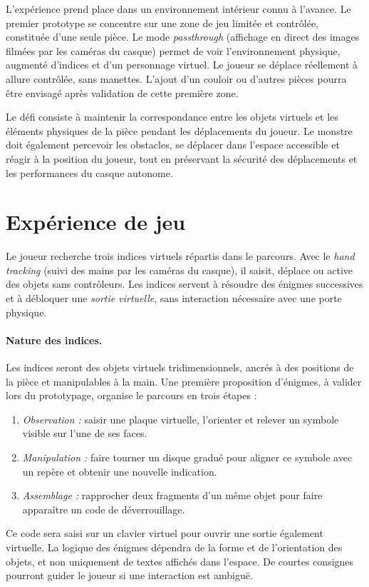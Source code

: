 \documentclass[11pt,a4paper]{article}
\begin{document}
L'expérience prend place dans un environnement intérieur connu à l'avance. Le premier prototype se concentre sur une zone de jeu limitée et contrôlée, constituée d'une seule pièce. Le mode \emph{passthrough} (affichage en direct des images filmées par les caméras du casque) permet de voir l'environnement physique, augmenté d'indices et d'un personnage virtuel. Le joueur se déplace réellement à allure contrôlée, sans manettes. L'ajout d'un couloir ou d'autres pièces pourra être envisagé après validation de cette première zone.

Le défi consiste à maintenir la correspondance entre les objets virtuels et les éléments physiques de la pièce pendant les déplacements du joueur. Le monstre doit également percevoir les obstacles, se déplacer dans l'espace accessible et réagir à la position du joueur, tout en préservant la sécurité des déplacements et les performances du casque autonome.

\section{Expérience de jeu}

Le joueur recherche trois indices virtuels répartis dans le parcours. Avec le \emph{hand tracking} (suivi des mains par les caméras du casque), il saisit, déplace ou active des objets sans contrôleurs. Les indices servent à résoudre des énigmes successives et à débloquer une \emph{sortie virtuelle}, sans interaction nécessaire avec une porte physique.

\paragraph{Nature des indices.} Les indices seront des objets virtuels tridimensionnels, ancrés à des positions de la pièce et manipulables à la main. Une première proposition d'énigmes, à valider lors du prototypage, organise le parcours en trois étapes :
\begin{enumerate}[leftmargin=1.9em,itemsep=0.16em,topsep=0.20em]
    \item \emph{Observation :} saisir une plaque virtuelle, l'orienter et relever un symbole visible sur l'une de ses faces.
    \item \emph{Manipulation :} faire tourner un disque gradué pour aligner ce symbole avec un repère et obtenir une nouvelle indication.
    \item \emph{Assemblage :} rapprocher deux fragments d'un même objet pour faire apparaître un code de déverrouillage.
\end{enumerate}
Ce code sera saisi sur un clavier virtuel pour ouvrir une sortie également virtuelle. La logique des énigmes dépendra de la forme et de l'orientation des objets, et non uniquement de textes affichés dans l'espace. De courtes consignes pourront guider le joueur si une interaction est ambiguë.
\end{document}
